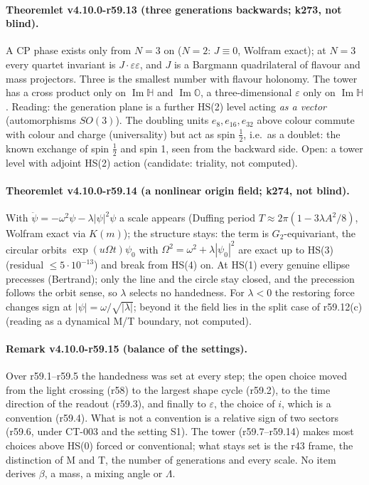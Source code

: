 \paragraph{Theoremlet v4.10.0-r59.13 (three generations backwards; k273, not blind).}
A CP phase exists only from \(N=3\) on (\(N=2\): \(J\equiv0\), Wolfram exact); at \(N=3\) every quartet invariant is \(J\cdot\varepsilon\varepsilon\), and \(J\) is a
Bargmann quadrilateral of flavour and mass projectors.  Three is the smallest number with flavour holonomy.  The tower has a cross product only
on \(\operatorname{Im}\mathbb H\) and \(\operatorname{Im}\mathbb O\), a three-dimensional \(\varepsilon\) only on \(\operatorname{Im}\mathbb H\).  Reading: the
generation plane is a further HS(2) level acting \emph{as a vector} (automorphisms \(SO(3)\)).  The doubling units \(e_8,e_{16},e_{32}\) above colour
commute with colour and charge (universality) but act as spin \(\tfrac12\), i.e.\ as a doublet: the known exchange of spin \(\tfrac12\) and spin 1, seen
from the backward side.  Open: a tower level with adjoint HS(2) action (candidate: triality, not computed).

\paragraph{Theoremlet v4.10.0-r59.14 (a nonlinear origin field; k274, not blind).}
With \(\ddot\psi=-\omega^2\psi-\lambda|\psi|^2\psi\) a scale appears (Duffing period \(T\approx2\pi(1-3\lambda A^2/8)\), Wolfram exact via \(K(m)\)); the structure
stays: the term is \(G_2\)-equivariant, the circular orbits \(\exp(u\Omega t)\psi_0\) with \(\Omega^2=\omega^2+\lambda|\psi_0|^2\) are exact up to HS(3)
(residual \(\le5\cdot10^{-13}\)) and break from HS(4) on.  At HS(1) every genuine ellipse precesses (Bertrand); only the line and the circle stay
closed, and the precession follows the orbit sense, so \(\lambda\) selects no handedness.  For \(\lambda<0\) the restoring force changes sign at
\(|\psi|=\omega/\sqrt{|\lambda|}\); beyond it the field lies in the split case of r59.12(c) (reading as a dynamical M/T boundary, not computed).

\paragraph{Remark v4.10.0-r59.15 (balance of the settings).}
Over r59.1--r59.5 the handedness was set at every step; the open choice moved from the light crossing (r58) to the largest shape cycle (r59.2),
to the time direction of the readout (r59.3), and finally to \(\varepsilon\), the choice of \(i\), which is a convention (r59.4).  What is not a
convention is a relative sign of two sectors (r59.6, under CT-003 and the setting S1).  The tower (r59.7--r59.14) makes most choices above HS(0)
forced or conventional; what stays set is the r43 frame, the distinction of M and T, the number of generations and every scale.  No item
derives \(\beta\), a mass, a mixing angle or \(\Lambda\).

